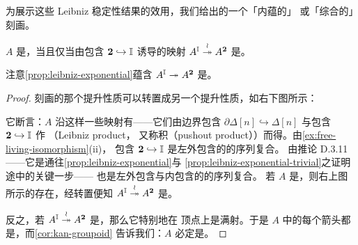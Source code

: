 为展示这些 Leibniz 稳定性结果的效用，我们给出\trKanComplex{}的一个「内蕴的」
或「综合的」刻画。

\begin{lemma}\label{lem:kan-internal}
\trQuasiCategory $A$ 是\trKanComplex{}，当且仅当由包含 $\mathbf{2}\hookrightarrow\mathbb{I}$
诱导的映射 $A^{\mathbb{I}}\overset{\wr}{\twoheadrightarrow} A^{\mathbf{2}}$ 是\trTrivialFibration{}。
\end{lemma}

注意\cref{prop:leibniz-exponential}蕴含
$A^{\mathbb{I}}\twoheadrightarrow A^{\mathbf{2}}$ 是\trIsofibration{}。
\begin{proof}
刻画\trTrivialFibration{}的那个提升性质可以转置成另一个提升性质，如右下图所示：
\begin{center}
\end{center}
它断言：$A$ 沿这样一些映射有\trExtension——它们由\trSimplex{}边界包含
$\partial\Delta[n]\hookrightarrow\Delta[n]$ 与包含
$\mathbf{2}\hookrightarrow\mathbb{I}$ 作 \emph{\trLeibnizProduct}（Leibniz product，
又称\trPushout{}积（pushout product））而得。由\cref{ex:free-living-isomorphism}(ii)，
包含 $\mathbf{2}\hookrightarrow\mathbb{I}$ 是左外\trHorn{}包含的\trPushout{}的序列复合。
由推论 D.3.11——它是通往\cref{prop:leibniz-exponential}与
\cref{prop:leibniz-exponential-trivial}之证明途中的关键一步——\trLeibnizProduct%
也是左外\trHorn{}包含与内\trHorn{}包含的\trPushout{}的序列复合。
若 $A$ 是\trKanComplex{}，则右上图所示的\trExtension{}存在，经转置便知
$A^{\mathbb{I}}\overset{\wr}{\twoheadrightarrow} A^{\mathbf{2}}$ 是\trTrivialFibration{}。

反之，若 $A^{\mathbb{I}}\overset{\wr}{\twoheadrightarrow} A^{\mathbf{2}}$ 是\trTrivialFibration{}，那么它特别地在
顶点上是满射。于是 $A$ 中的每个箭头都是\trIsomorphism{}，而\cref{cor:kan-groupoid}
告诉我们：$A$ 必定是\trKanComplex{}。
\end{proof}

